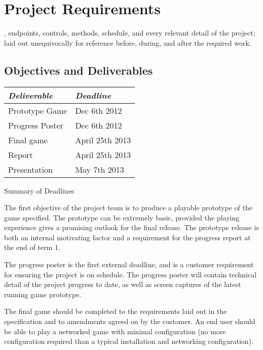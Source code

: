 \chapter[Project Requirements]{Project Requirements}
\label{ch:reference}


, endpoints, controls, methods, schedule, and every relevant detail of the project; laid out unequivocally for reference before, during, and after the required work.

\section{Objectives and Deliverables}

\begin{margintable}
\vspace{12em}
\renewcommand{\arraystretch}{1.5}
\begin{tabular}
{p{8em} p{7em}}
		\toprule
		\emph{Deliverable} & \emph{Deadline} \\
		\midrule
		Prototype Game & Dec 6th 2012\\
		Progress Poster & Dec 6th 2012\\
		Final game & April 25th 2013\\
		Report & April 25th 2013\\
		Presentation & May 7th 2013 \\
		\bottomrule
\end{tabular}
\vspace{0.5em}
\caption{Summary of Deadlines}
\end{margintable}

The first objective of the project team is to produce a playable prototype of the game specified. 
The prototype can be extremely basic, provided the playing experience gives a promising outlook for the final release. The prototype release is both an internal motivating factor and a requirement for the progress report at the end of term 1.

The progress poster is the first external deadline, and is a customer requirement for ensuring the project is on schedule. The progress poster will contain technical detail of the project progress to date, as well as screen captures of the latest running game prototype.

The final game should be completed to the requirements laid out in the specification and to amendments agreed on by the customer. An end user should be able to play a networked game with minimal configuration (no more configuration required than a typical installation and networking configuration).

